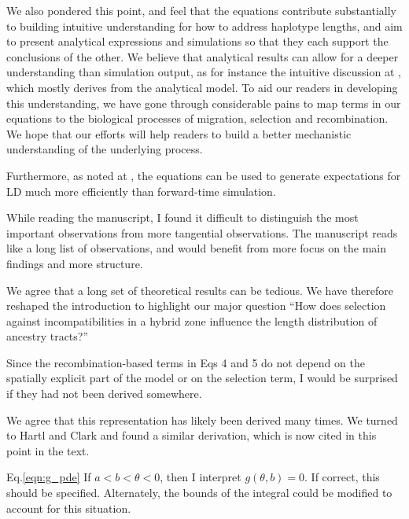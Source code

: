\reply
We also pondered this point, and feel that the equations contribute substantially
to building intuitive understanding for how to address haplotype lengths,
and aim to present analytical expressions and simulations so that they each support the conclusions of the other.
We believe that analytical results can allow for a deeper understanding than simulation output,
as for instance the intuitive discussion at ,
which mostly derives from the analytical model.
To aid our readers in developing this understanding, we have gone through considerable pains to map terms in our equations to the biological processes of migration, selection and recombination. 
We hope that our efforts will help readers to build a better mechanistic understanding of the underlying process.

Furthermore, as noted at , the equations can be used to generate expectations for LD much more efficiently than forward-time simulation.

\begin{point}{}
    While reading the manuscript, I found it difficult to distinguish the most important observations from more tangential observations. The manuscript reads like a long list of observations, and would benefit from more focus on the main findings and more structure.
\end{point}

\reply
    We agree that a long set of theoretical results can be tedious. We have therefore reshaped the introduction to highlight our major question ``How does selection against incompatibilities in a hybrid zone influence the length distribution of ancestry tracts?'' 

\begin{point}{}
Since the recombination-based terms in Eqs 4 and 5 do not depend on the spatially explicit part of the model or on the selection term, I would be surprised if they had not been derived somewhere.
\end{point}

\reply
We agree that this representation has likely been derived many times. 
We turned to Hartl and Clark and found a similar derivation, which is now cited in this point in the text.

\begin{point}{Eq.\ref{eqn:g_pde}}
If $a<b<\theta<0$, then I interpret $g(\theta,b) = 0$. If correct, this should be specified.  Alternately, the bounds of the integral could be modified to account for this situation.
\end{point}

